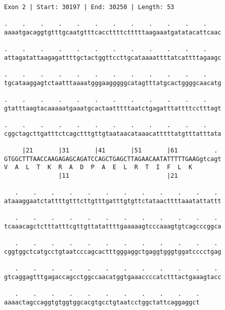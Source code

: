 \documentclass{article}
\begin{document}
\newpage
\begin{Verbatim}
Exon 2 | Start: 30197 | End: 30250 | Length: 53
 
.    .    .    .    .    .    .    .    .    .    .    .    
aaaatgacaggtgtttgcaatgtttcaccttttctttttaagaaatgatatacattcaac
  
.    .    .    .    .    .    .    .    .    .    .    .    
attagatattaagagattttgctactggttccttgcataaaattttatcattttagaagc
  
.    .    .    .    .    .    .    .    .    .    .    .    
tgcataaggagtctaatttaaaatgggaagggggcatagtttatgcactggggcaacatg
  
.    .    .    .    .    .    .    .    .    .    .    .    
gtatttaagtacaaaaatgaaatgcactaatttttaatctgagatttattttcctttagt
  
.    .    .    .    .    .    .    .    .    .    .    .    
cggctagcttgatttctcagctttgttgtaataacataaacatttttatgtttatttata
  
     |21       |31       |41       |51       |61          . 
GTGGCTTTAACCAAGAGAGCAGATCCAGCTGAGCTTAGAACAATATTTTTGAAGgtcagt
V  A  L  T  K  R  A  D  P  A  E  L  R  T  I  F  L  K        
               |11                           |21            
  
   .    .    .    .    .    .    .    .    .    .    .    . 
ataaaggaatctattttgtttcttgtttgatttgtgttctataacttttaaatattattt
  
   .    .    .    .    .    .    .    .    .    .    .    . 
tcaaacagctctttatttcgttgttatattttgaaaaagtcccaaagtgtcagcccggca
  
   .    .    .    .    .    .    .    .    .    .    .    . 
cggtggctcatgcctgtaatcccagcactttgggaggctgaggtgggtggatcccctgag
  
   .    .    .    .    .    .    .    .    .    .    .    . 
gtcaggagtttgagaccagcctggccaacatggtgaaaccccatctttactgaaagtacc
  
   .    .    .    .    .    .    .    .    .    .    .
aaaactagccaggtgtggtggcacgtgcctgtaatcctggctattcaggaggct
\end{Verbatim}
\newpage
\end{document}
